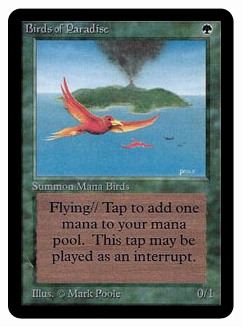 \documentclass{beamer}
\begin{document}
\begin{frame}
\begin{columns}
\begin{column}{.5\textwidth}
{                }
                 {
                    \includegraphics[width=\textwidth] {./img/bird_of_paradise/main.jpg}
                }
                 {
}
\end{column}
\end{columns}
\end{frame}
\end{document}
